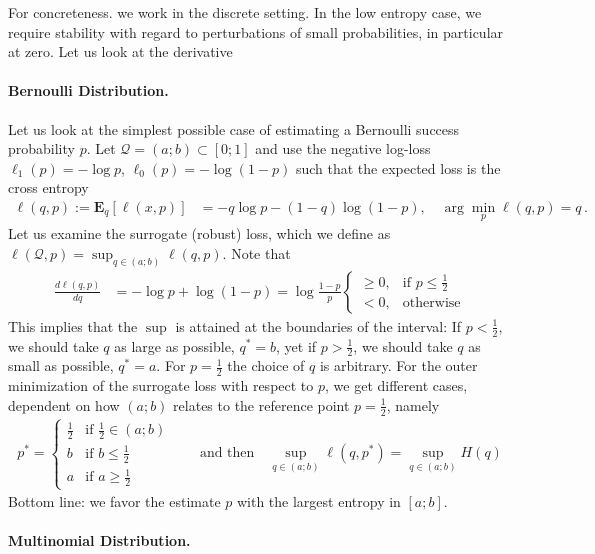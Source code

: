 \documentclass{article}
\newcommand{\E}{{\mathbf E}}
\begin{document}
For concreteness. we work in the discrete setting. In the low entropy case, we require stability with regard to perturbations of small probabilities, in particular at zero. Let us look at the derivative 





\paragraph{Bernoulli Distribution.}
Let us look at the simplest possible case of estimating a Bernoulli success probability $p$. Let $\mathcal Q = (a;b) \subset [0;1]$ and use the negative log-loss $\ell_1(p) = - \log p$, $\ell_0(p) = -\log (1-p)$ such that the expected loss is the cross entropy 
\begin{align}
\ell(q,p) := \E_q[\ell(x,p)] & = -q \log p - (1-q) \log (1-p), \quad \arg\min_p \ell(q,p) = q\,.
\end{align}
Let us examine the surrogate (robust) loss, which we define as
$\ell(\mathcal Q,p) = \sup_{q \in (a;b)} \ell(q,p)$.
Note that 
\begin{align}
\frac{d \ell(q,p)}{dq} & = - \log p + \log (1-p) = \log \frac{1-p}{p} 
\begin{cases} 
\ge 0, & \text{if }p \le\frac 12 \\
<0, & \text{otherwise}
 \end{cases}
\end{align}
This implies that the $\sup$ is attained at the boundaries of the interval: If $p < \frac 12$, we should take $q$ as large as possible, $q^* = b$, yet if $p  > \frac12$, we should take $q$ as small as possible, $q^* = a$. For $p=\frac12$ the choice of $q$ is arbitrary. For the outer minimization of the surrogate loss with respect to $p$, we get different cases, dependent on how $(a;b)$ relates to the reference point $p = \tfrac 12$, namely
\begin{align}
p^* = 
	\begin{cases} 
		\frac{1}{2} & \text{if $\tfrac 12 \in (a;b)$} \\
		b & \text{if $b \le \frac 12$} \\
		a & \text{if $a \ge \frac 12$}
	\end{cases}
\qquad \text{and then} \quad
\sup_{q \in (a;b)} \ell(q,p^*) = \sup_{q \in (a;b)} H(q) 
\end{align}
Bottom line: we favor the estimate $p$ with the largest entropy in $[a;b]$. 

\paragraph{Multinomial Distribution.}
\end{document}
